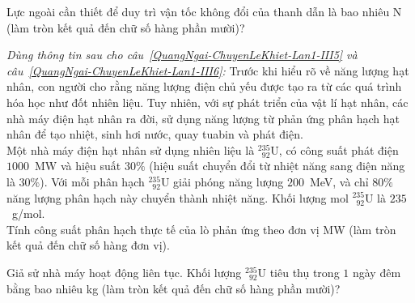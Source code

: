 	\begin{ex}%
		\label{QuangNgai-ChuyenLeKhiet-Lan1-III4}Lực ngoài cần thiết để duy trì vận tốc không đổi của thanh dẫn là bao nhiêu N (làm tròn kết quả đến chữ số hàng phần mười)?
		\par
	\end{ex}

	\begin{ex}%
		\label{QuangNgai-ChuyenLeKhiet-Lan1-III5}\textit{Dùng thông tin sau cho câu~\ref{QuangNgai-ChuyenLeKhiet-Lan1-III5} và câu~\ref{QuangNgai-ChuyenLeKhiet-Lan1-III6}:} Trước khi hiểu rõ về năng lượng hạt nhân, con người cho rằng năng lượng điện chủ yếu được tạo ra từ các quá trình hóa học như đốt nhiên liệu. Tuy nhiên, với sự phát triển của vật lí hạt nhân, các nhà máy điện hạt nhân ra đời, sử dụng năng lượng từ phản ứng phân hạch hạt nhân để tạo nhiệt, sinh hơi nước, quay tuabin và phát điện.\\
		Một nhà máy điện hạt nhân sử dụng nhiên liệu là $^{235}_{\phantom{2}92}\text{U}$, có công suất phát điện $1000$~MW và hiệu suất $30\%$ (hiệu suất chuyển đổi từ nhiệt năng sang điện năng là $30\%$). Với mỗi phân hạch $^{235}_{\phantom{2}92}\text{U}$ giải phóng năng lượng $200$~MeV, và chỉ $80\%$ năng lượng phân hạch này chuyển thành nhiệt năng. Khối lượng mol $^{235}_{\phantom{2}92}\text{U}$ là $235$~g/mol.\\
		Tính công suất phân hạch thực tế của lò phản ứng theo đơn vị MW (làm tròn kết quả đến chữ số hàng đơn vị).
		\par
	\end{ex}

	\begin{ex}%
		\label{QuangNgai-ChuyenLeKhiet-Lan1-III6}Giả sử nhà máy hoạt động liên tục. Khối lượng $^{235}_{\phantom{2}92}\text{U}$ tiêu thụ trong $1$ ngày đêm bằng bao nhiêu kg (làm tròn kết quả đến chữ số hàng phần mười)?
		\par
	\end{ex}

